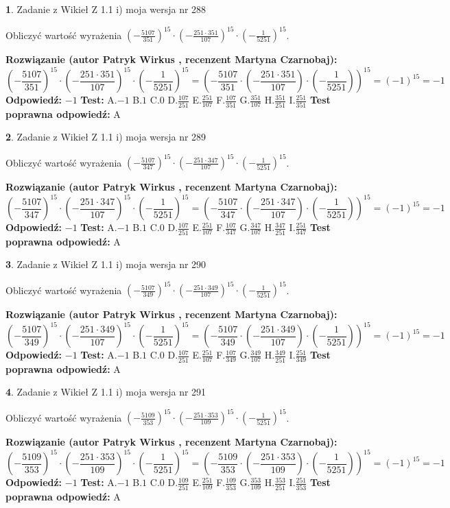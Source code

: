 \documentclass[12pt, a4paper]{article}
\theoremstyle{definition} %
\newtheorem{zad}{}
\newcommand{\zadStart}[1]{\begin{zad}#1\newline}
\newcommand{\zadStop}{\end{zad}}
\newcommand{\rozwStart}[2]{\noindent \textbf{Rozwiązanie (autor #1 , recenzent #2): }\newline}
\newcommand{\rozwStop}{\newline}
\newcommand{\odpStart}{\noindent \textbf{Odpowiedź:}\newline}
\newcommand{\odpStop}{\newline}
\newcommand{\testStart}{\noindent \textbf{Test:}\newline}
\newcommand{\testStop}{\newline}
\newcommand{\kluczStart}{\noindent \textbf{Test poprawna odpowiedź:}\newline}
\newcommand{\kluczStop}{\newline}
\begin{document}
\zadStart{Zadanie z Wikieł Z 1.1 i) moja wersja nr 288}

Obliczyć wartość wyrażenia $(-\frac{5107}{351})^{15} \cdot (-\frac{251 \cdot 351}{107})^{15} \cdot (-\frac{1}{5251})^{15}$.
\zadStop
\rozwStart{Patryk Wirkus}{Martyna Czarnobaj}
$$(-\frac{5107}{351})^{15} \cdot (-\frac{251 \cdot 351}{107})^{15} \cdot (-\frac{1}{5251})^{15} = (-\frac{5107}{351} \cdot (-\frac{251 \cdot 351}{107}) \cdot (-\frac{1}{5251}))^{15} = (-1)^{15} = -1$$
\rozwStop
\odpStart
$-1$
\odpStop
\testStart
A.$-1$ B.$1$ C.$0$ D.$\frac{107}{251}$ E.$\frac{251}{107}$
F.$\frac{107}{351}$ G.$\frac{351}{107}$
H.$\frac{351}{251}$
I.$\frac{251}{351}$
\testStop
\kluczStart
A
\kluczStop



\zadStart{Zadanie z Wikieł Z 1.1 i) moja wersja nr 289}

Obliczyć wartość wyrażenia $(-\frac{5107}{347})^{15} \cdot (-\frac{251 \cdot 347}{107})^{15} \cdot (-\frac{1}{5251})^{15}$.
\zadStop
\rozwStart{Patryk Wirkus}{Martyna Czarnobaj}
$$(-\frac{5107}{347})^{15} \cdot (-\frac{251 \cdot 347}{107})^{15} \cdot (-\frac{1}{5251})^{15} = (-\frac{5107}{347} \cdot (-\frac{251 \cdot 347}{107}) \cdot (-\frac{1}{5251}))^{15} = (-1)^{15} = -1$$
\rozwStop
\odpStart
$-1$
\odpStop
\testStart
A.$-1$ B.$1$ C.$0$ D.$\frac{107}{251}$ E.$\frac{251}{107}$
F.$\frac{107}{347}$ G.$\frac{347}{107}$
H.$\frac{347}{251}$
I.$\frac{251}{347}$
\testStop
\kluczStart
A
\kluczStop



\zadStart{Zadanie z Wikieł Z 1.1 i) moja wersja nr 290}

Obliczyć wartość wyrażenia $(-\frac{5107}{349})^{15} \cdot (-\frac{251 \cdot 349}{107})^{15} \cdot (-\frac{1}{5251})^{15}$.
\zadStop
\rozwStart{Patryk Wirkus}{Martyna Czarnobaj}
$$(-\frac{5107}{349})^{15} \cdot (-\frac{251 \cdot 349}{107})^{15} \cdot (-\frac{1}{5251})^{15} = (-\frac{5107}{349} \cdot (-\frac{251 \cdot 349}{107}) \cdot (-\frac{1}{5251}))^{15} = (-1)^{15} = -1$$
\rozwStop
\odpStart
$-1$
\odpStop
\testStart
A.$-1$ B.$1$ C.$0$ D.$\frac{107}{251}$ E.$\frac{251}{107}$
F.$\frac{107}{349}$ G.$\frac{349}{107}$
H.$\frac{349}{251}$
I.$\frac{251}{349}$
\testStop
\kluczStart
A
\kluczStop



\zadStart{Zadanie z Wikieł Z 1.1 i) moja wersja nr 291}

Obliczyć wartość wyrażenia $(-\frac{5109}{353})^{15} \cdot (-\frac{251 \cdot 353}{109})^{15} \cdot (-\frac{1}{5251})^{15}$.
\zadStop
\rozwStart{Patryk Wirkus}{Martyna Czarnobaj}
$$(-\frac{5109}{353})^{15} \cdot (-\frac{251 \cdot 353}{109})^{15} \cdot (-\frac{1}{5251})^{15} = (-\frac{5109}{353} \cdot (-\frac{251 \cdot 353}{109}) \cdot (-\frac{1}{5251}))^{15} = (-1)^{15} = -1$$
\rozwStop
\odpStart
$-1$
\odpStop
\testStart
A.$-1$ B.$1$ C.$0$ D.$\frac{109}{251}$ E.$\frac{251}{109}$
F.$\frac{109}{353}$ G.$\frac{353}{109}$
H.$\frac{353}{251}$
I.$\frac{251}{353}$
\testStop
\kluczStart
A
\kluczStop
\end{document}
